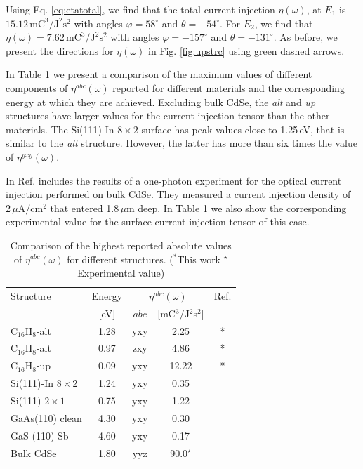 \documentclass[pss]{wiley2sp} %
\begin{document}
Using Eq. \eqref{eq:etatotal}, we find that the total current injection
$\eta(\omega)$, at $E_{1}$ is
$15.12\,\mathrm{mC}^{3}/\mathrm{J}^{2}\mathrm{s}^{2}$ with angles
$\varphi=58^{\circ}$ and $\theta=-54^{\circ}$. For $E_{2}$, we find that
$\eta(\omega)=7.62\,\mathrm{mC}^{3}/\mathrm{J}^{2}\mathrm{s}^{2}$ with angles
$\varphi=-157^{\circ}$ and $\theta=-131^{\circ}$. As before, we present the
directions for $\eta(\omega)$ in Fig. \ref{fig:upstrc} using green dashed
arrows.

In Table \ref{tab:etacomp} we present a comparison of the maximum values of
different components of $\eta^{abc}(\omega)$ reported for different materials
and the corresponding energy at which they are achieved. Excluding bulk CdSe,
the \emph{alt} and \emph{up} structures have larger values for the current
injection tensor than the other materials. The Si(111)-In $8\times 2$ surface
has peak values close to 1.25\,eV, that is similar to the \emph{alt}
structure. However, the latter has more than six times the value of
$\eta^{yxy}(\omega)$.

In Ref. \cite{lamanAPL99} includes the results of a one-photon experiment for
the optical current injection performed on bulk CdSe. They measured a current
injection density of 2\,$\mu\mathrm{A}/\mathrm{cm}^{2}$ that entered
1.8\,$\mu\mathrm{m}$ deep. In Table \ref{tab:etacomp} we also show the
corresponding experimental value for the surface current injection tensor of
this case.


\begin{table}%
\sidecaption
\begin{tabular}{lcccc}
\hline
\hline
Structure & Energy &  \multicolumn{2}{c}{$\eta^{abc}(\omega)$} &  Ref.\\
\cline{3-4}
          & [eV]   & $abc$ & [mC$^{3}$/J$^{2}$s$^{2}$] \\
\hline
C$_{16}$H$_{8}$-alt     & 1.28  & yxy & 2.25  & *     \\
C$_{16}$H$_{8}$-alt     & 0.97  & zxy & 4.86  & *     \\
C$_{16}$H$_{8}$-up      & 0.09  & yxy & 12.22 & *     \\
Si(111)-In $8\times2$   & 1.24  & yxy & 0.35  & \cite{arzatePRB14}  \\
Si(111) $2\times1$      & 0.75  & yxy & 1.22  & \cite{cabellosPRB11} \\
GaAs(110) clean         & 4.30  & yxy & 0.30  & \cite{cabellosPRB11}     \\
GaS (110)-Sb            & 4.60  & yxy & 0.17  & \cite{cabellosPRB11}\\
Bulk CdSe               & 1.80  & yyz & 90.0$^{\star}$  & \cite{lamanAPL99}\\
\hline
\hline
\end{tabular}
\caption[]{%
Comparison of the highest reported absolute values of {$\eta^{abc}(\omega)$}
for different structures. ($^{*}$This work $^{\star}$Experimental value)}
\label{tab:etacomp}
\end{table}
\end{document}

